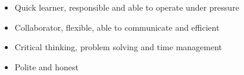 \documentclass[letterpaper]{engineer_cv} %
\begin{document}
	\begin{longList} %
		\longListItem
			{}
			{}
			{}
			{\begin{itemize}
			  \item Quick learner, responsible and able to operate under pressure
			  \item Collaborator, flexible, able to communicate and efficient
              \item Critical thinking, problem solving and time management
              \item Polite and honest
			\end{itemize}}
			{}
			{}
	\end{longList}



\end{document}
